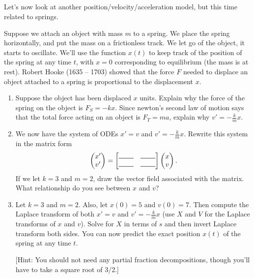 \subsection*{\ideaE}
Let's now look at another position/velocity/acceleration model, but this time related to springs. 
\begin{problem}
Suppose we attach an object with mass $m$ to a spring.  We place the spring horizontally, and put the mass on a frictionless track. 
We let go of the object, it starts to oscillate. We'll use the function $x(t)$ to keep track of the position of the spring at any time $t$, with $x=0$ corresponding to equilibrium (the mass is at rest). Robert Hooke (1635 -- 1703) showed that the force $F$ needed to displace an object attached to a spring is proportional to the displacement $x$. 
\begin{enumerate}
 \item Suppose the object has been displaced $x$ units. Explain why the force of the spring on the object is $F_S = -kx$. Since newton's second law of motion says that the total force acting on an object is $F_T=ma$,  explain why $v'=-\frac{k}{m}x$.  
 \item We now have the system of ODEs $x'=v$ and $v'=-\frac{k}{m}x$.  Rewrite this system in the matrix form 
$$\pvec{x'\\v'} = \begin{bmatrix}\rule{.3in}{.5pt}&\rule{.3in}{.5pt}\\\rule{.3in}{.5pt}&\rule{.3in}{.5pt}\end{bmatrix}\pvec{x\\v}.$$
 If we let $k=3$ and $m=2$, draw the vector field associated with the matrix. 
What relationship do you see between $x$ and $v$?
 \item Let $k=3$ and $m=2$.  Also, let $x(0)=5$ and $v(0)=7$.  Then compute the Laplace transform of both $x'=v$ and $v'=-\frac{k}{m}x$ (use $X$ and $V$ for the Laplace transforms of $x$ and $v$). Solve for $X$ in terms of $s$ and then invert Laplace transform both sides. You can now predict the exact position $x(t)$ of the spring at any time $t$. 

[Hint: You should not need any partial fraction decompositions, though you'll have to take a square root of 3/2.]
\end{enumerate}

\end{problem}

